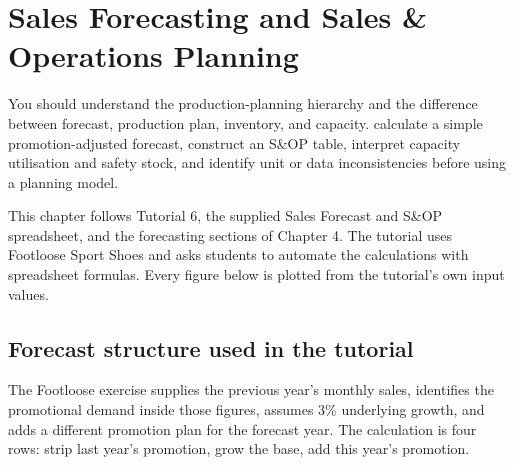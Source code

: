\chapter{Sales Forecasting and Sales \& Operations Planning}
\label{ch:forecasting-sop}

\chapterguide
  {You should understand the production-planning hierarchy and the difference between forecast, production plan, inventory, and capacity.}
  {calculate a simple promotion-adjusted forecast, construct an S\&OP table, interpret capacity utilisation and safety stock, and identify unit or data inconsistencies before using a planning model.}

\begin{sourcebasis}
This chapter follows Tutorial 6, the supplied Sales Forecast and S\&OP
spreadsheet, and the forecasting sections of Chapter 4. The tutorial uses
Footloose Sport Shoes and asks students to automate the calculations with
spreadsheet formulas. Every figure below is plotted from the tutorial's own
input values.
\end{sourcebasis}

\section{Forecast structure used in the tutorial}

The Footloose exercise supplies the previous year's monthly sales, identifies
the promotional demand inside those figures, assumes 3\% underlying growth, and
adds a different promotion plan for the forecast year. The calculation is four
rows: strip last year's promotion, grow the base, add this year's promotion.

\begin{utptable}
\end{utptable}

